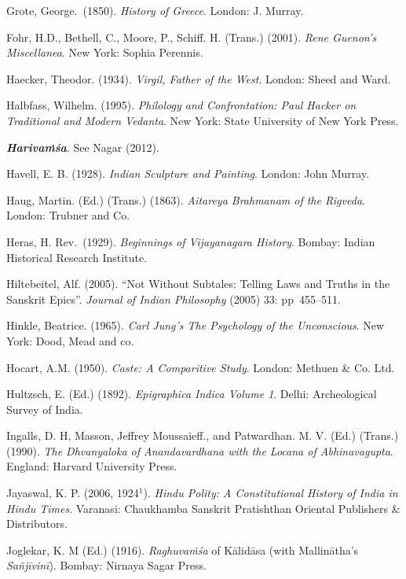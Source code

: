 \begin{thebibliography}{99}
Grote, George.\ (1850). {\sl History of Greece}.  London: J. Murray. 

Fohr, H.D., Bethell, C., Moore, P., Schiff. H. (Trans.) (2001). {\sl Rene Guenon’s Miscellanea}. New York: Sophia Perennis. 

Haecker, Theodor. (1934). {\sl Virgil, Father of the West}. London: Sheed and Ward. 

Halbfass, Wilhelm. (1995). {\sl Philology and Confrontation: Paul Hacker on Traditional and Modern Vedanta}. New York: State University of New York Press. 

{\sl\bfseries Harivaṁśa}. See Nagar (2012). 

Havell, E. B. (1928). {\sl Indian Sculpture and Painting}. London: John Murray. 

Haug, Martin. (Ed.) (Trans.) (1863). {\sl Aitareya Brahmanam of the Rigveda}. London: Trubner and Co. 

Heras, H. Rev.\ (1929). {\sl Beginnings of Vijayanagara History}. Bombay: Indian Historical Research Institute. 

Hiltebeitel, Alf. (2005). “Not Without Subtales: Telling Laws and Truths in the Sanskrit Epics”. {\sl Journal 
of Indian Philosophy} (2005) 33: pp~455--511.

Hinkle, Beatrice. (1965). {\sl Carl Jung’s The Psychology of the Unconscious}. New York: Dood, Mead and co. 

Hocart, A.M. (1950). {\sl Caste: A Comparitive Study}. London: Methuen \& Co. Ltd. 

Hultzsch, E. (Ed.) (1892). {\sl Epigraphica Indica Volume 1}. Delhi: Archeological Survey of India. 

Ingalls, D. H,  Masson, Jeffrey Moussaieff., and Patwardhan. M. V. (Ed.) (Trans.) (1990). {\sl The Dhvanyaloka of 
Anandavardhana with the Locana of Abhinavagupta}. England: Harvard University Press. 

Jayaswal, K. P. (2006, 1924$^{1}$). {\sl Hindu Polity: A Constitutional History of India in Hindu Times}. Varanasi: Chaukhamba Sanskrit Pratishthan Oriental Publishers \& Distributors. 

Joglekar, K. M (Ed.) (1916). {\sl Raghuvaṁśa} of Kālidāsa (with Mallinātha’s {\sl Sañjīvinī}). Bombay: Nirnaya Sagar Press.  


\end{thebibliography}
